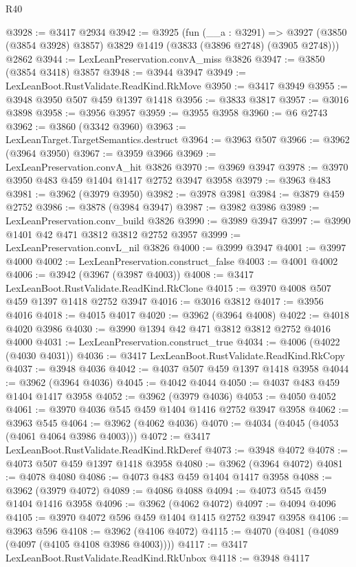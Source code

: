 \begin{lexlean}{R40}
\begin{coremodule}
@3928 := @3417 @2934
@3942 := @3925
    (fun (__a : @3291) =>
    @3927 (@3850 (@3854 @3928) @3857) @3829 @1419 (@3833 (@3896 @2748) (@3905 @2748)))
    @2862
@3944 := LexLeanPreservation.convA_miss @3826
@3947 := @3850 (@3854 @3418) @3857
@3948 := @3944 @3947
@3949 := LexLeanBoot.RustValidate.ReadKind.RkMove
@3950 := @3417 @3949
@3955 := @3948 @3950 @507 @459 @1397 @1418
@3956 := @3833 @3817
@3957 := @3016 @3898
@3958 := @3956 @3957
@3959 := @3955 @3958
@3960 := @6 @2743
@3962 := @3860 (@3342 @3960)
@3963 := LexLeanTarget.TargetSemantics.destruct
@3964 := @3963 @507
@3966 := @3962 (@3964 @3950)
@3967 := @3959 @3966
@3969 := LexLeanPreservation.convA_hit @3826
@3970 := @3969 @3947
@3978 := @3970 @3950 @483 @459 @1404 @1417 @2752 @3947 @3958
@3979 := @3963 @483
@3981 := @3962 (@3979 @3950)
@3982 := @3978 @3981
@3984 := @3879 @459 @2752
@3986 := @3878 (@3984 @3947)
@3987 := @3982 @3986
@3989 := LexLeanPreservation.conv_build @3826
@3990 := @3989 @3947
@3997 := @3990 @1401 @42 @471 @3812 @3812 @2752 @3957
@3999 := LexLeanPreservation.convL_nil @3826
@4000 := @3999 @3947
@4001 := @3997 @4000
@4002 := LexLeanPreservation.construct_false
@4003 := @4001 @4002
@4006 := @3942 (@3967 (@3987 @4003))
@4008 := @3417 LexLeanBoot.RustValidate.ReadKind.RkClone
@4015 := @3970 @4008 @507 @459 @1397 @1418 @2752 @3947
@4016 := @3016 @3812
@4017 := @3956 @4016
@4018 := @4015 @4017
@4020 := @3962 (@3964 @4008)
@4022 := @4018 @4020 @3986
@4030 := @3990 @1394 @42 @471 @3812 @3812 @2752 @4016 @4000
@4031 := LexLeanPreservation.construct_true
@4034 := @4006 (@4022 (@4030 @4031))
@4036 := @3417 LexLeanBoot.RustValidate.ReadKind.RkCopy
@4037 := @3948 @4036
@4042 := @4037 @507 @459 @1397 @1418 @3958
@4044 := @3962 (@3964 @4036)
@4045 := @4042 @4044
@4050 := @4037 @483 @459 @1404 @1417 @3958
@4052 := @3962 (@3979 @4036)
@4053 := @4050 @4052
@4061 := @3970 @4036 @545 @459 @1404 @1416 @2752 @3947 @3958
@4062 := @3963 @545
@4064 := @3962 (@4062 @4036)
@4070 := @4034 (@4045 (@4053 (@4061 @4064 @3986 @4003)))
@4072 := @3417 LexLeanBoot.RustValidate.ReadKind.RkDeref
@4073 := @3948 @4072
@4078 := @4073 @507 @459 @1397 @1418 @3958
@4080 := @3962 (@3964 @4072)
@4081 := @4078 @4080
@4086 := @4073 @483 @459 @1404 @1417 @3958
@4088 := @3962 (@3979 @4072)
@4089 := @4086 @4088
@4094 := @4073 @545 @459 @1404 @1416 @3958
@4096 := @3962 (@4062 @4072)
@4097 := @4094 @4096
@4105 := @3970 @4072 @596 @459 @1404 @1415 @2752 @3947 @3958
@4106 := @3963 @596
@4108 := @3962 (@4106 @4072)
@4115 := @4070 (@4081 (@4089 (@4097 (@4105 @4108 @3986 @4003))))
@4117 := @3417 LexLeanBoot.RustValidate.ReadKind.RkUnbox
@4118 := @3948 @4117

\end{coremodule}
\end{lexlean}
